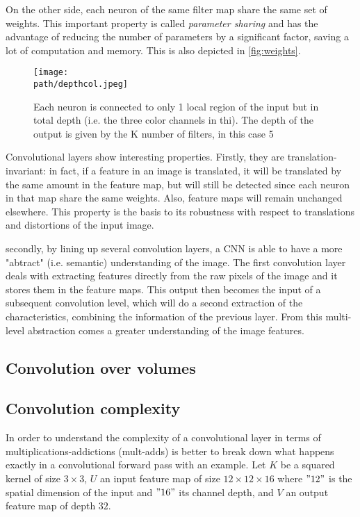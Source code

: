 On the other side, each neuron of the same filter map share the same set of weights. This important property is called \emph{parameter sharing} and has the advantage of reducing the number of parameters by a significant factor, saving a lot of computation and memory. This is also depicted in \ref{fig:weights}.  

\begin{figure}[h!]
 \centering
 \texttt{[image: \\path/depthcol.jpeg]} 
 \caption{Each neuron is connected to only 1 local region of the input but in total depth (i.e. the three color channels in thi). The depth of the output is given by the K number of filters, in this case 5}
 \label{fig:depth}
\end{figure}

 Convolutional layers show interesting properties. Firstly, they are translation-invariant: in fact, if a feature in an image is translated, it will be translated by the same amount in the feature map, but will still be detected since each neuron in that map share the same weights. Also, feature maps will remain unchanged elsewhere. This property is the basis to its robustness with respect to translations and distortions of the input image. 
 
 secondly, by lining up several convolution layers, a CNN is able to have a more "abtract" (i.e. semantic) understanding of the image. The first convolution layer deals with extracting features directly from the raw pixels of the image and it stores them in the feature maps. This output then becomes the input of a subsequent convolution level, which will do a second extraction of the characteristics, combining the information of the previous layer. From this multi-level abstraction comes a greater understanding of the image features.
 
 \subsection{Convolution over volumes}

 
 \subsection{Convolution complexity}
 \label{subsec:cnn-complexity}
 In order to understand the complexity of a convolutional layer in terms of multiplications-addictions (mult-adds) is better to break down what happens exactly in a convolutional forward pass with an example. 
 Let $K$ be a squared kernel of size $3 \times 3$, $U$ an input feature map of size $12 \times 12 \times 16$ where $"12"$ is the spatial dimension of the input and $"16"$ its channel depth, and $V$ an output feature map of depth $32$.
 
